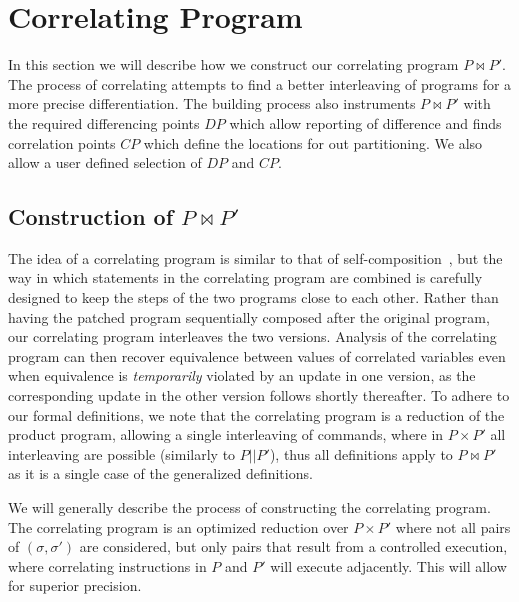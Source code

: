 \section{Correlating Program} 

In this section we will describe how we construct our correlating program $P \bowtie P'$. The process of correlating attempts to find a better interleaving of programs for a more precise differentiation. The building process also instruments $P \bowtie P'$ with the required differencing points $DP$ which allow reporting of difference and finds correlation points $CP$ which define the locations for out partitioning. We also allow a user defined selection of $DP$ and $CP$.

\subsection{Construction of $P \bowtie P'$ }
The idea of a correlating program is similar to that of
self-composition~\cite{AikenTerauchi05}, but the way in
which statements in the correlating program are combined is carefully designed to
keep the steps of the two programs close to each other. Rather than having
the patched program sequentially composed after the original program, our
correlating program interleaves the two versions. Analysis of the correlating program can then recover equivalence between values of correlated variables even when
equivalence is \emph{temporarily} violated by an update in one version, as
the corresponding update in the other version follows shortly thereafter. To adhere to our formal definitions, we note that the correlating program is a reduction of the product program, allowing a single interleaving of commands, where in $P \times P'$ all interleaving are possible (similarly to $P||P'$), thus all definitions apply to $P \bowtie P'$ as it is a single case of the generalized definitions.

We will generally describe the process of constructing the correlating program. The correlating program is an optimized reduction over $P \times P'$ where not all pairs of $(\sigma,\sigma')$ are considered, but only pairs that result from a controlled execution, where correlating instructions in $P$ and $P'$ will execute adjacently. This will allow for superior precision.

